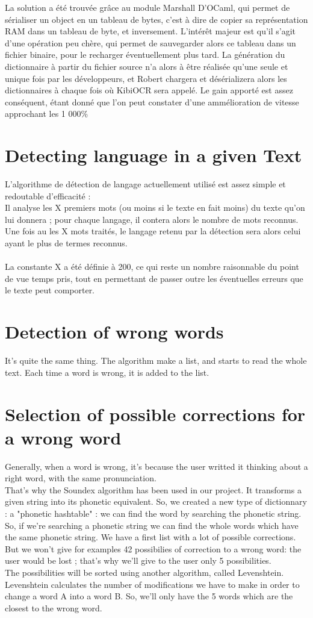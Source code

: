 La solution a été trouvée grâce au module Marshall D'OCaml, qui permet de sérialiser un object en un tableau de bytes,
c'est à dire de copier sa représentation RAM dans un tableau de byte, et inversement. L'intérêt majeur est qu'il s'agit
d'une opération peu chère, qui permet de sauvegarder alors ce tableau dans un fichier binaire, pour le recharger
éventuellement plus tard. La génération du dictionnaire à partir du fichier source n'a alors à être réalisée qu'une
seule et unique fois par les développeurs, et Robert chargera et désérializera alors les dictionnaires à chaque fois
où KibiOCR sera appelé. Le gain apporté est assez conséquent, étant donné que l'on peut constater d'une ammélioration
de vitesse approchant les 1 000\%

\section{Detecting language in a given Text}
L'algorithme de détection de langage actuellement utilisé est assez simple et redoutable d'efficacité :\\
Il analyse les X premiers mots (ou moins si le texte en fait moins) du texte qu'on lui donnera ; pour chaque langage, il contera alors le nombre de mots
reconnus. Une fois au les X mots traités, le langage retenu par la détection sera alors celui ayant le plus de termes reconnus.\\
\\
La constante X a été définie à 200, ce qui reste un nombre raisonnable du point de vue temps pris, tout en permettant de passer outre les
éventuelles erreurs que le texte peut comporter.\\
\section{Detection of wrong words}
It's quite the same thing. The algorithm make a list, and starts to read the whole text. Each time a word is wrong, it is added to the list.
\section{Selection of possible corrections for a wrong word}
Generally, when a word is wrong, it's because the user writted it thinking about a right word, with the same pronunciation.\\
That's why the Soundex algorithm has been used in our project. It transforms a given string into its phonetic equivalent.
So, we created a new type of dictionnary : a "phonetic hashtable" : we can find the word by searching the phonetic string.
So, if we're searching a phonetic string we can find the whole words which have the same phonetic string.
We have a first list with a lot of possible corrections.\\
But we won't give for examples 42 possibilies of correction to a wrong word: the user would be lost ; that's why we'll give
to the user only 5 possibilities.\\
The possibilities will be sorted using another algorithm, called Levenshtein.
Levenshtein calculates the number of modifications we have to make in order to change a word A into a word B.
So, we'll only have the 5 words which are the closest to the wrong word. 
